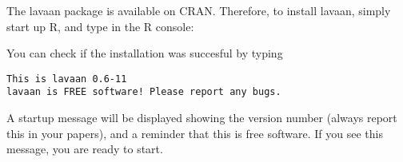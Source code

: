 The lavaan package is available on CRAN. Therefore, to install lavaan,
simply start up R, and type in the R console:

\begin{Shaded}
\begin{Highlighting}[]
\NormalTok{(}\NormalTok{, } \NormalTok{)}
\end{Highlighting}
\end{Shaded}

You can check if the installation was succesful by typing

\begin{Shaded}
\begin{Highlighting}[]
\end{Highlighting}
\end{Shaded}

\begin{verbatim}
This is lavaan 0.6-11
lavaan is FREE software! Please report any bugs.
\end{verbatim}

A startup message will be displayed showing the version number (always
report this in your papers), and a reminder that this is free software.
If you see this message, you are ready to start.
